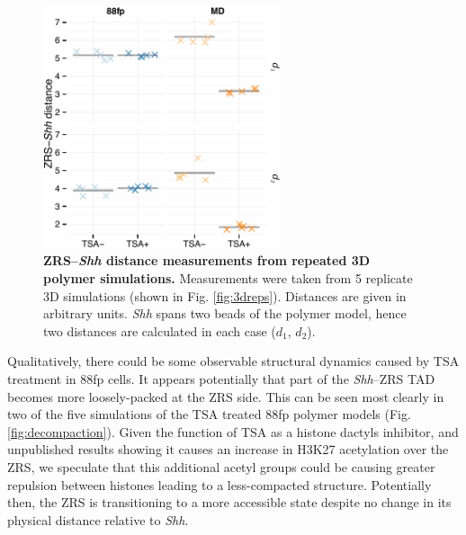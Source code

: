 \documentclass[a4paper,11pt,oneside]{book}
\begin{document}
\begin{figure}
\begin{center} 
\includegraphics[width=2.75in]{figs/3d_dists.pdf}
\captionsetup{width=\textwidth} 
\caption[ ZRS--\emph{Shh} distance measurements from repeated 3D polymer simulations. ]{ {\bf ZRS--\emph{Shh} distance measurements from repeated 3D polymer simulations. }
Measurements were taken from 5 replicate 3D simulations (shown in Fig. \ref{fig:3dreps}). Distances are given in arbitrary units. \emph{Shh} spans two beads of the polymer model, hence two distances are calculated in each case ($d_1$, $d_2$).
}\label{fig:3ddist}
\end{center} 
\end{figure} 

Qualitatively, there could be some observable structural dynamics caused by TSA treatment in 88fp cells. It appears potentially that part of the \emph{Shh}--ZRS TAD becomes more loosely-packed at the ZRS side. This can be seen most clearly in two of the five simulations of the TSA treated 88fp polymer models (Fig. \ref{fig:decompaction}). Given the function of TSA as a histone dactyls inhibitor, and unpublished results showing it causes an increase in H3K27 acetylation over the ZRS, we speculate that this additional acetyl groups could be causing greater repulsion between histones leading to a less-compacted structure. Potentially then, the ZRS is transitioning to a more accessible state despite no change in its physical distance relative to \emph{Shh}.
\end{document}
